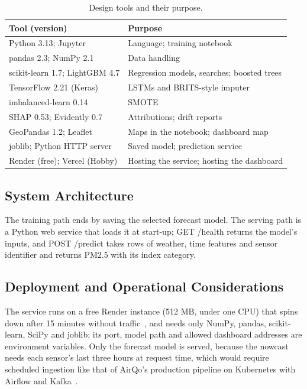\documentclass{ieeeaccess}
\begin{document}
\begin{table}[t]
\caption{Design tools and their purpose.}
\label{tab:tools}
\centering
\footnotesize
\begin{tabularx}{\columnwidth}{>{\raggedright\arraybackslash}X>{\raggedright\arraybackslash}X}
\toprule
Tool (version) & Purpose \\
\midrule
Python 3.13; Jupyter & Language; training notebook \\
pandas 2.3; NumPy 2.1 & Data handling \\
scikit-learn 1.7; LightGBM 4.7 & Regression models, searches; boosted trees \\
TensorFlow 2.21 (Keras) & LSTMs and BRITS-style imputer \\
imbalanced-learn 0.14 & SMOTE \\
SHAP 0.53; Evidently 0.7 & Attributions; drift reports \\
GeoPandas 1.2; Leaflet & Maps in the notebook; dashboard map \\
joblib; Python HTTP server & Saved model; prediction service \\
Render (free); Vercel (Hobby) & Hosting the service; hosting the dashboard \\
\bottomrule
\end{tabularx}
\end{table}

\subsection{System Architecture}\label{sec:system-architecture}

The training path ends by saving the selected forecast model. The serving path is a Python web service that loads it at start-up; GET /health returns the model's inputs, and POST /predict takes rows of weather, time features and sensor identifier and returns PM2.5 with its index category.

\subsection{Deployment and Operational Considerations}\label{sec:deployment-and-operational-considerations}

The service runs on a free Render instance (512 MB, under one CPU) that spins down after 15 minutes without traffic~\cite{ref_render}, and needs only NumPy, pandas, scikit-learn, SciPy and joblib; its port, model path and allowed dashboard addresses are environment variables. Only the forecast model is served, because the nowcast needs each sensor's last three hours at request time, which would require scheduled ingestion like that of AirQo's production pipeline on Kubernetes with Airflow and Kafka~\cite{ref_sserunjogi2025}.
\end{document}
